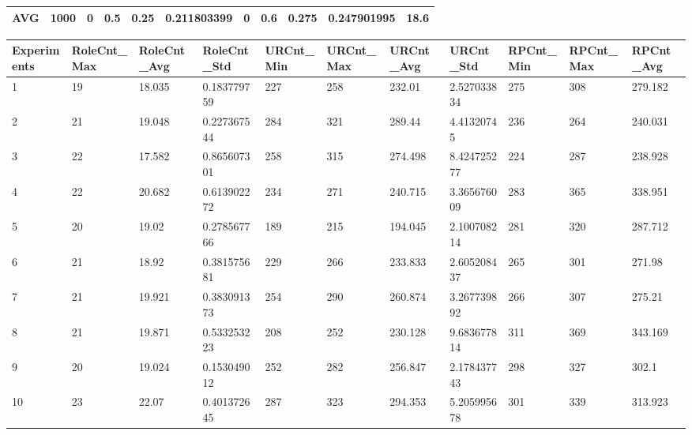 \begin{table}[H]
\begin{adjustbox}{max width=380pt,keepaspectratio,angle=90}
\begin{tabular}{|l|l|l|l|l|l|l|l|l|l|l|}
				AVG         & 1000  & 0         & 0.5       & 0.25      & 0.211803399 & 0         & 0.6       & 0.275     & 0.247901995 & 18.6         \\ \hline
			\end{tabular}
		\end{adjustbox}
		\begin{adjustbox}{max width=380pt,keepaspectratio,angle=90}
			\begin{tabular}{|l|l|l|l|l|l|l|l|l|l|l|}
				\hline
				\rowcolor[HTML]{EFEFEF} 
				Experiments & RoleCnt\_Max & RoleCnt\_Avg & RoleCnt\_Std & URCnt\_Min & URCnt\_Max & URCnt\_Avg & URCnt\_Std  & RPCnt\_Min & RPCnt\_Max & RPCnt\_Avg \\ \hline
				1           & 19           & 18.035       & 0.183779759  & 227        & 258        & 232.01     & 2.527033834 & 275        & 308        & 279.182    \\ \hline
				2           & 21           & 19.048       & 0.227367544  & 284        & 321        & 289.44     & 4.41320745  & 236        & 264        & 240.031    \\ \hline
				3           & 22           & 17.582       & 0.865607301  & 258        & 315        & 274.498    & 8.424725277 & 224        & 287        & 238.928    \\ \hline
				4           & 22           & 20.682       & 0.613902272  & 234        & 271        & 240.715    & 3.365676009 & 283        & 365        & 338.951    \\ \hline
				5           & 20           & 19.02        & 0.278567766  & 189        & 215        & 194.045    & 2.100708214 & 281        & 320        & 287.712    \\ \hline
				6           & 21           & 18.92        & 0.381575681  & 229        & 266        & 233.833    & 2.605208437 & 265        & 301        & 271.98     \\ \hline
				7           & 21           & 19.921       & 0.383091373  & 254        & 290        & 260.874    & 3.267739892 & 266        & 307        & 275.21     \\ \hline
				8           & 21           & 19.871       & 0.533253223  & 208        & 252        & 230.128    & 9.683677814 & 311        & 369        & 343.169    \\ \hline
				9           & 20           & 19.024       & 0.153049012  & 252        & 282        & 256.847    & 2.178437743 & 298        & 327        & 302.1      \\ \hline
				10          & 23           & 22.07        & 0.401372645  & 287        & 323        & 294.353    & 5.205995678 & 301        & 339        & 313.923    \\ \hline

\end{tabular}
\end{adjustbox}
\end{table}
